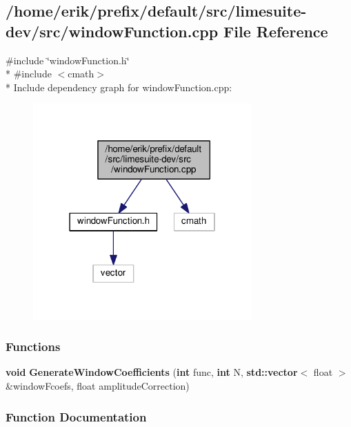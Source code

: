 \subsection{/home/erik/prefix/default/src/limesuite-\/dev/src/window\+Function.cpp File Reference}
\label{windowFunction_8cpp}
{\ttfamily \#include \char`\"{}window\+Function.\+h\char`\"{}}\\*
{\ttfamily \#include $<$cmath$>$}\\*
Include dependency graph for window\+Function.\+cpp\+:
\nopagebreak
\begin{figure}[H]
\begin{center}
\leavevmode
\includegraphics[width=238pt]{d7/ddd/windowFunction_8cpp__incl}
\end{center}
\end{figure}
\subsubsection*{Functions}
\begin{DoxyCompactItemize}
\item 
{\bf void} {\bf Generate\+Window\+Coefficients} ({\bf int} func, {\bf int} N, {\bf std\+::vector}$<$ float $>$ \&window\+Fcoefs, float amplitude\+Correction)
\end{DoxyCompactItemize}


\subsubsection{Function Documentation}
